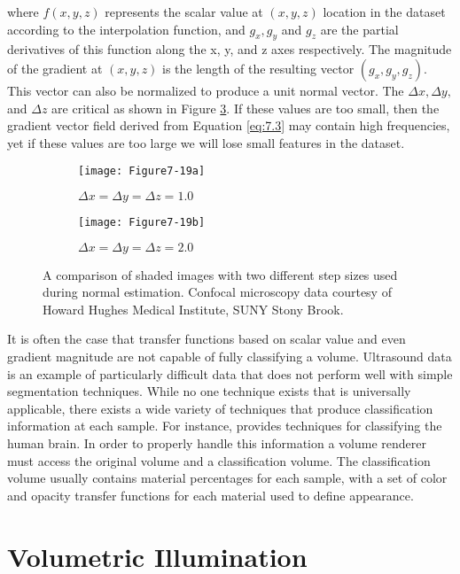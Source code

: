 where $f(x,y,z)$ represents the scalar value at $(x,y,z)$ location in the dataset according to the interpolation function, and $g_x, g_y$ and $g_z$ are the partial derivatives of this function along the x, y, and z axes respectively. The magnitude of the gradient at $(x,y,z)$ is the length of the resulting vector $(g_x, g_y, g_z)$. This vector can also be normalized to produce a unit normal vector. The  $\Delta x, \Delta y, $ and $\Delta z$ are critical as shown in Figure \ref{fig:Figure7-19}. If these values are too small, then  the gradient vector field derived from Equation \ref{eq:7.3} may contain high frequencies, yet if these values are too large we will lose small features in the dataset.

\begin{figure}[!htb]
	\begin{subfigure}[h]{0.48\linewidth}
		\texttt{[image: Figure7-19a]}
		\caption*{$\Delta x = \Delta y = \Delta z = 1.0$}\label{fig:Figure7-19a}
	\end{subfigure}
	\hfill
	\begin{subfigure}[h]{0.48\linewidth}
		\texttt{[image: Figure7-19b]}
		\caption*{$\Delta x = \Delta y = \Delta z = 2.0$}\label{fig:Figure7-19b}
	\end{subfigure}%
	\caption{A comparison of shaded images with two different step sizes used during normal estimation. Confocal microscopy data courtesy of Howard Hughes Medical Institute, SUNY Stony Brook.}\label{fig:Figure7-19}
\end{figure}


It is often the case that transfer functions based on scalar value and even gradient magnitude are not capable of fully classifying a volume. Ultrasound data is an example of particularly difficult data that does not perform well with simple segmentation techniques. While no one technique exists that is universally applicable, there exists a wide variety of techniques that produce classification information at each sample. For instance, \cite{Kikinis96} provides techniques for classifying the human brain. In order to properly handle this information a volume renderer must access the original volume and a classification volume. The classification volume usually contains material percentages for each sample, with a set of color and opacity transfer functions for each material used to define appearance.

\section{Volumetric Illumination}

